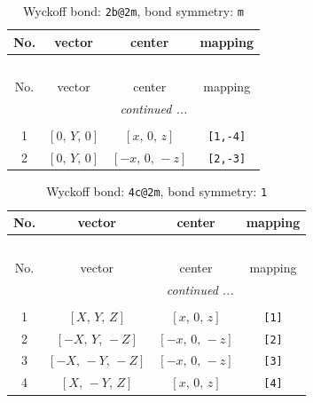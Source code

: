 \documentclass[fleqn,8pt]{jsarticle}
\begin{document}
\renewcommand{\arraystretch}{1.2}
\begin{longtable}{cccc}
\caption{Wyckoff bond: {\tt 2b@2m}, bond symmetry: {\tt m}}
 \\
 \hline \hline
No. & vector & center & mapping \\ \hline \endfirsthead

\multicolumn{3}{l}{\tablename\ \thetable{}} \\
 \hline \hline
No. & vector & center & mapping \\ \hline \endhead

 \hline \hline
\multicolumn{3}{r}{\footnotesize\it continued ...} \\ \endfoot

 \hline \hline
\multicolumn{3}{r}{} \\ \endlastfoot

1 & $\left[ 0,\, Y,\, 0 \right]$ & $\left[ x,\, 0,\, z \right]$ & {\tt [1,-4]} \\ \hline
2 & $\left[ 0,\, Y,\, 0 \right]$ & $\left[ - x,\, 0,\, - z \right]$ & {\tt [2,-3]} \\
\end{longtable}
\renewcommand{\arraystretch}{1.2}
\begin{longtable}{cccc}
\caption{Wyckoff bond: {\tt 4c@2m}, bond symmetry: {\tt 1}}
 \\
 \hline \hline
No. & vector & center & mapping \\ \hline \endfirsthead

\multicolumn{3}{l}{\tablename\ \thetable{}} \\
 \hline \hline
No. & vector & center & mapping \\ \hline \endhead

 \hline \hline
\multicolumn{3}{r}{\footnotesize\it continued ...} \\ \endfoot

 \hline \hline
\multicolumn{3}{r}{} \\ \endlastfoot

1 & $\left[ X,\, Y,\, Z \right]$ & $\left[ x,\, 0,\, z \right]$ & {\tt [1]} \\ \hline
2 & $\left[ - X,\, Y,\, - Z \right]$ & $\left[ - x,\, 0,\, - z \right]$ & {\tt [2]} \\ \hline
3 & $\left[ - X,\, - Y,\, - Z \right]$ & $\left[ - x,\, 0,\, - z \right]$ & {\tt [3]} \\ \hline
4 & $\left[ X,\, - Y,\, Z \right]$ & $\left[ x,\, 0,\, z \right]$ & {\tt [4]} \\
\end{longtable}
\end{document}
